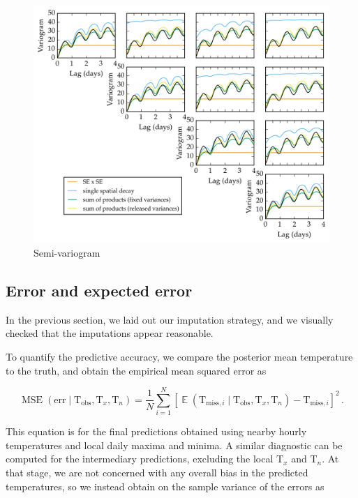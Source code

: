 \documentclass[letter]{article}
\makeatletter
\def\maxwidth{\ifdim\Gin@nat@width>\linewidth\linewidth
\else\Gin@nat@width\fi}
\let\Oldincludegraphics\includegraphics
\renewcommand{\includegraphics}[1]{\Oldincludegraphics[width=.8\maxwidth]{#1}}
\newcommand{\genericdel}[3]{%
      \left#1#3\right#2
    }
\newcommand{\del}[1]{\genericdel(){#1}}
\newcommand{\sbr}[1]{\genericdel[]{#1}}
\DeclareMathOperator{\E}{\mathbb{E}}
\DeclareMathOperator{\mse}{{MSE}}
\newcommand{\T}{\mathrm{T}}
\newcommand{\Tn}{\T_{n}}
\newcommand{\Tx}{\T_{x}}
\newcommand{\miss}{\mathrm{miss}}
\newcommand{\obs}{\mathrm{obs}}
\newcommand{\error}{\mathrm{err}}
\makeatother
\begin{document}
\begin{figure}
\centering
\includegraphics{figures/spatial_variogram.png}
\caption{Semi-variogram}
\end{figure}
    


    	\subsection{Error and expected error}\label{error-and-expected-error}

In the previous section, we laid out our imputation strategy, and we
visually checked that the imputations appear reasonable.

To quantify the predictive accuracy, we compare the posterior mean
temperature to the truth, and obtain the empirical mean squared error as

\begin{equation}
    \label{eq:mse}
    \mse\del{\error \mid \T_\obs,\Tx,\Tn} = \frac{1}{N} \sum_{i=1}^N \sbr{\E\del{\T_{\miss,i} \mid \T_\obs,\Tx,\Tn} - \T_{\miss,i}}^2\,.
\end{equation}

This equation is for the final predictions obtained using nearby hourly
temperatures and local daily maxima and minima. A similar diagnostic can
be computed for the intermediary predictions, excluding the local
\(\Tx\) and \(\Tn\). At that stage, we are not concerned with any
overall bias in the predicted temperatures, so we instead obtain on the
sample variance of the errors as
\end{document}
